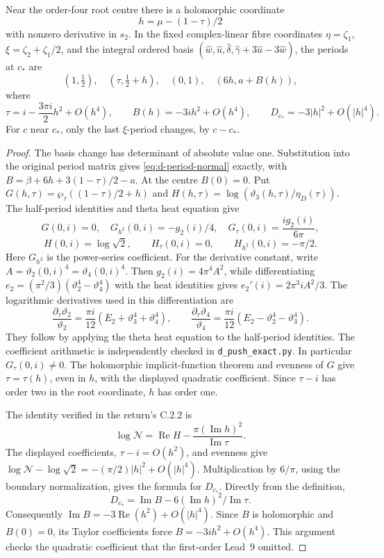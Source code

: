 \begin{lemma}\label{push:src:D.2.1}
Near the order-four root centre there is a holomorphic coordinate
\[
 h=\mu-(1-\tau)/2
\]
with nonzero derivative in \(s_2\). In the fixed complex-linear fibre
coordinates \(\eta=\zeta_1\), \(\xi=\zeta_2+\zeta_1/2\), and the
integral ordered basis
\((\widehat w,\widehat u,\widehat\delta,
\widehat\gamma+3\widehat u-3\widehat w)\), the periods at \(c_*\) are
\begin{equation}\label{eq:d-period-normal}
 (1,\tfrac12),\quad(\tau,\tfrac12+h),\quad(0,1),\quad(6h,a+B(h)),
\end{equation}
where
\[
 \tau=i-\frac{3\pi i}{2}h^2+O(h^4),\qquad
 B(h)=-3ih^2+O(h^4),\qquad
 D_{c_*}=-3|h|^2+O(|h|^4).
\]
For \(c\) near \(c_*\), only the last \(\xi\)-period changes, by
\(c-c_*\).
\end{lemma}
\begin{proof}
The basis change has determinant of absolute value one. Substitution
into the original period matrix gives \eqref{eq:d-period-normal}
exactly, with
\(B=\beta+6h+3(1-\tau)/2-a\).
At the centre \(B(0)=0\). Put
\(G(h,\tau)=\wp_\tau((1-\tau)/2+h)\) and
\(H(h,\tau)=\log(\vartheta_3(h,\tau)/\eta_D(\tau))\).
The half-period identities and theta heat equation give
\[
 G(0,i)=0,\quad G_{h^2}(0,i)=-g_2(i)/4,\quad
 G_\tau(0,i)=\frac{i g_2(i)}{6\pi},
\]
\[
 H(0,i)=\log\sqrt2,\qquad H_\tau(0,i)=0,\qquad
 H_{h^2}(0,i)=-\pi/2.
\]
Here \(G_{h^2}\) is the power-series coefficient. For the derivative
constant, write \(A=\vartheta_2(0,i)^4=\vartheta_4(0,i)^4\).
Then \(g_2(i)=4\pi^4A^2\), while differentiating
\(e_2=(\pi^2/3)(\vartheta_2^4-\vartheta_4^4)\) with the heat
identities gives \(e_2'(i)=2\pi^3iA^2/3\).
The logarithmic derivatives used in this differentiation are
\[
 \frac{\partial_\tau\vartheta_2}{\vartheta_2}
  =\frac{\pi i}{12}(E_2+\vartheta_3^4+\vartheta_4^4),\qquad
 \frac{\partial_\tau\vartheta_4}{\vartheta_4}
  =\frac{\pi i}{12}(E_2-\vartheta_2^4-\vartheta_3^4).
\]
They follow by applying the theta heat equation to the half-period
identities. The coefficient arithmetic is independently checked in
\texttt{d\_push\_exact.py}. In particular \(G_\tau(0,i)\ne0\).
The holomorphic implicit-function theorem and evenness of \(G\) give
\(\tau=\tau(h)\), even in \(h\), with the displayed quadratic
coefficient. Since \(\tau-i\) has order two in the root coordinate,
\(h\) has order one.

The identity verified in the return's C.2.2 is
\[
 \log\mathcal N=\operatorname{Re}H-
       \frac{\pi(\operatorname{Im}h)^2}{\operatorname{Im}\tau}.
\]
The displayed coefficients, \(\tau-i=O(h^2)\), and evenness give
\(\log\mathcal N-\log\sqrt2=-(\pi/2)|h|^2+O(|h|^4)\).
Multiplication by \(6/\pi\), using the boundary normalization, gives
the formula for \(D_{c_*}\). Directly from the definition,
\[
 D_{c_*}=\operatorname{Im}B-
             6(\operatorname{Im}h)^2/\operatorname{Im}\tau.
\]
Consequently \(\operatorname{Im}B=-3\operatorname{Re}(h^2)
+O(|h|^4)\). Since \(B\) is holomorphic and \(B(0)=0\), its Taylor
coefficients force \(B=-3ih^2+O(h^4)\). This argument checks the
quadratic coefficient that the first-order Lead~9 omitted.
\end{proof}

